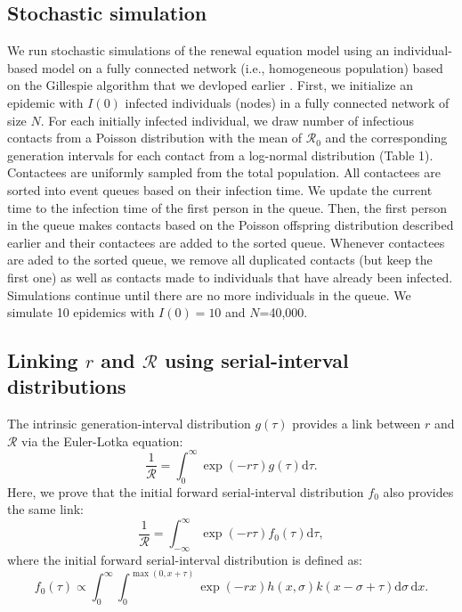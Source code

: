 \documentclass[12pt]{article}
\begin{document}
\subsection{Stochastic simulation}

We run stochastic simulations of the renewal equation model using an individual-based model on a fully connected network (i.e., homogeneous population) based on the Gillespie algorithm that we devloped earlier \citep{park2019inferring}.
First, we initialize an epidemic with $I(0)$ infected individuals (nodes) in a fully connected network of size $N$. 
For each initially infected individual, we draw number of infectious contacts from a Poisson distribution with the mean of $\mathcal R_0$ and the corresponding generation intervals for each contact from a log-normal distribution (Table 1).
Contactees are uniformly sampled from the total population.
All contactees are sorted into event queues based on their infection time.
We update the current time to the infection time of the first person in the queue.
Then, the first person in the queue makes contacts based on the Poisson offspring distribution described earlier and their contactees are added to the sorted queue.
Whenever contactees are aded to the sorted queue, we remove all duplicated contacts (but keep the first one) as well as contacts made to individuals that have already been infected.
Simulations continue until there are no more individuals in the queue.
We simulate 10 epidemics with $I(0)=10$ and $N$=40,000.

\subsection{Linking $r$ and $\mathcal R$ using serial-interval distributions}

The intrinsic generation-interval distribution $g(\tau)$ provides a link between $r$ and $\mathcal R$ via the Euler-Lotka equation:
\begin{equation}
\frac{1}{\mathcal R} = \int_0^\infty \exp(-r\tau) g(\tau) \mathrm{d} \tau.
\end{equation}
Here, we prove that the initial forward serial-interval distribution $f_0$ also provides the same link:
\begin{equation}
\frac{1}{\mathcal R} = \int_{-\infty}^\infty \exp(-r\tau) f_{0}(\tau) \mathrm{d} \tau,
\end{equation}
where the initial forward serial-interval distribution is defined as:
\begin{equation}
f_{0}(\tau) \propto \int_{0}^{\infty} \int_{0}^{\max(0,x+\tau)} \exp(-rx) h(x, \sigma) k(x-\sigma+\tau) \mathrm{d}\sigma\,\mathrm{d}x.
\end{equation}
\end{document}
